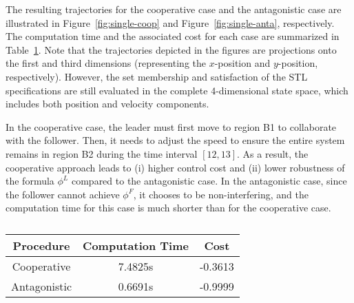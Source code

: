 \documentclass[letterpaper, 10 pt, conference]{ieeeconf}
\begin{document}
The resulting trajectories for the cooperative case and the antagonistic case are illustrated in Figure~\ref{fig:single-coop} and Figure~\ref{fig:single-anta}, respectively. The computation time and the associated cost for each case are summarized in Table~\ref{tab:1}. 
Note that the trajectories depicted in the figures are projections onto the first and third dimensions (representing the $x$-position and $y$-position, respectively). However, the set membership and satisfaction of the STL specifications are still evaluated in the complete 4-dimensional state space, which includes both position and velocity components. 


In the cooperative case, the leader must first move to region B1 to collaborate with the follower. Then, it needs to adjust the speed to ensure the entire system remains in region B2 during the time interval $[12, 13]$. As a result, the cooperative approach leads to (i) higher control cost and (ii) lower robustness of the formula $\phi^L$ compared to the antagonistic case. In the antagonistic case, since the follower cannot achieve $\phi^F$, it chooses to be non-interfering, and the computation time for this case is much shorter than for the cooperative case.

\begin{table}[t]
    \caption{}
    \centering
    \begin{tabular}{c|c|c}
    \hline
     Procedure & Computation Time & Cost\\    
    \hline
     Cooperative & 7.4825s & -0.3613\\
    \hline
     Antagonistic & 0.6691s & -0.9999\\
    \hline
    
    \end{tabular}
    \vspace{10pt}
    \label{tab:1}
\end{table}

 
\end{document}
